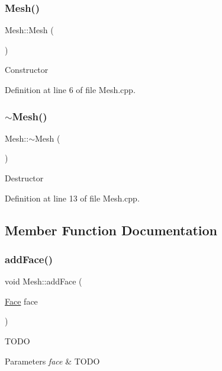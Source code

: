 \subsubsection{\texorpdfstring{Mesh()}{Mesh()}}
{\footnotesize\ttfamily Mesh\+::\+Mesh (\begin{DoxyParamCaption}{ }\end{DoxyParamCaption})}

Constructor 

Definition at line 6 of file Mesh.\+cpp.

\mbox{\label{class_mesh_a5efe4da1a4c0971cfb037bd70304c303}} 
\subsubsection{\texorpdfstring{$\sim$\+Mesh()}{~Mesh()}}
{\footnotesize\ttfamily Mesh\+::$\sim$\+Mesh (\begin{DoxyParamCaption}{ }\end{DoxyParamCaption})}

Destructor 

Definition at line 13 of file Mesh.\+cpp.



\subsection{Member Function Documentation}
\mbox{\label{class_mesh_a2ee41f5ae475f12dfaf34a265bff32f9}} 
\subsubsection{\texorpdfstring{add\+Face()}{addFace()}\hspace{0.1cm}{\footnotesize\ttfamily [1/2]}}
{\footnotesize\ttfamily void Mesh\+::add\+Face (\begin{DoxyParamCaption}\item[{\hyperlink{struct_face}{Face}}]{face }\end{DoxyParamCaption})}

T\+O\+DO 
\begin{DoxyParams}{Parameters}
{\em face} & T\+O\+DO \\
\hline
\end{DoxyParams}


